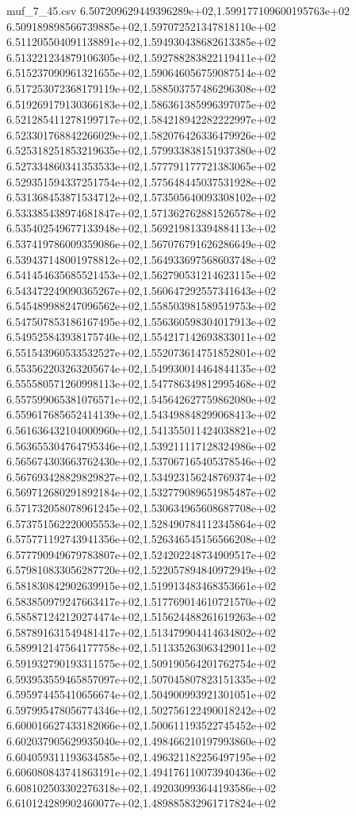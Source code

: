 \begin{filecontents*}{muf_7_45.csv}
6.507209629449396289e+02,1.599177109600195763e+02
6.509189898566739885e+02,1.597072521347818110e+02
6.511205504091138891e+02,1.594930438682613385e+02
6.513221234879106305e+02,1.592788283822119411e+02
6.515237090961321655e+02,1.590646056759087514e+02
6.517253072368179119e+02,1.588503757486296308e+02
6.519269179130366183e+02,1.586361385996397075e+02
6.521285411278199717e+02,1.584218942282222997e+02
6.523301768842266029e+02,1.582076426336479926e+02
6.525318251853219635e+02,1.579933838151937380e+02
6.527334860341353533e+02,1.577791177721383065e+02
6.529351594337251754e+02,1.575648445037531928e+02
6.531368453871534712e+02,1.573505640093308102e+02
6.533385438974681847e+02,1.571362762881526578e+02
6.535402549677133948e+02,1.569219813394884113e+02
6.537419786009359086e+02,1.567076791626286649e+02
6.539437148001978812e+02,1.564933697568603748e+02
6.541454635685521453e+02,1.562790531214623115e+02
6.543472249090365267e+02,1.560647292557341643e+02
6.545489988247096562e+02,1.558503981589519753e+02
6.547507853186167495e+02,1.556360598304017913e+02
6.549525843938175740e+02,1.554217142693833011e+02
6.551543960533532527e+02,1.552073614751852801e+02
6.553562203263205674e+02,1.549930014464844135e+02
6.555580571260998113e+02,1.547786349812995468e+02
6.557599065381076571e+02,1.545642627759862080e+02
6.559617685652414139e+02,1.543498848299068413e+02
6.561636432104000960e+02,1.541355011424038821e+02
6.563655304764795346e+02,1.539211117128324986e+02
6.565674303663762430e+02,1.537067165405378546e+02
6.567693428829829827e+02,1.534923156248769374e+02
6.569712680291892184e+02,1.532779089651985487e+02
6.571732058078961245e+02,1.530634965608687708e+02
6.573751562220005553e+02,1.528490784112345864e+02
6.575771192743941356e+02,1.526346545156566208e+02
6.577790949679783807e+02,1.524202248734909517e+02
6.579810833056287720e+02,1.522057894840972949e+02
6.581830842902639915e+02,1.519913483468353661e+02
6.583850979247663417e+02,1.517769014610721570e+02
6.585871242120274474e+02,1.515624488261619263e+02
6.587891631549481417e+02,1.513479904414634802e+02
6.589912147564177758e+02,1.511335263063429011e+02
6.591932790193311575e+02,1.509190564201762754e+02
6.593953559465857097e+02,1.507045807823151335e+02
6.595974455410656674e+02,1.504900993921301051e+02
6.597995478056774346e+02,1.502756122490018242e+02
6.600016627433182066e+02,1.500611193522745452e+02
6.602037905629935040e+02,1.498466210197993860e+02
6.604059311193634585e+02,1.496321182256497195e+02
6.606080843741863191e+02,1.494176110073940436e+02
6.608102503302276318e+02,1.492030993644193586e+02
6.610124289902460077e+02,1.489885832961717824e+02

\end{filecontents*}
